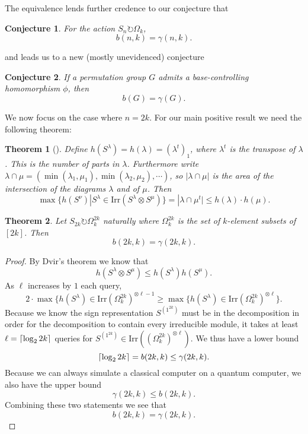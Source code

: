 \documentclass[12pt,twoside]{reedthesis}
\theoremstyle{plain}   %
\newtheorem{thm}{Theorem}[section] %
\newtheorem{conj}{Conjecture}[section]
\theoremstyle{definition}
\theoremstyle{remark}
\numberwithin{equation}{section}
\def\irr{\mathrm{Irr}}
\def\acts{\circlearrowright} %
\DeclarePairedDelimiter\ceil{\lceil}{\rceil}
\begin{document}
The equivalence lends further credence to our conjecture that
\begin{conj}
  For the action $S_n \acts \Omega_k$,
  \[ b(n,k) = \gamma(n,k).\]
\end{conj}
and leads us to a new (mostly unevidenced) conjecture
\begin{conj}
  If a permutation group $G$ admits a base-controlling homomorphism $\phi$, then
  \[ b(G) = \gamma(G).\]
\end{conj}
We now focus on the case where $n = 2k$.
For our main positive result we need the following theorem:
\begin{thm}[{\cite{dvir1993}}]
  Define $h( S^\lambda) = h(\lambda) = (\lambda^t)_1$, where $\lambda^t$ is the transpose of $\lambda$. This is the number of parts in $\lambda$.
  Furthermore write $\lambda \cap \mu = ( \min(\lambda_1,\mu_1), \min(\lambda_2,\mu_2), \cdots)$, so
  $|\lambda \cap \mu|$ is the area of the intersection of the diagrams $\lambda$ and of $\mu$. Then
  \[\max \{ h(S^\nu) | S^\lambda \in \irr (S^\lambda \otimes S^\mu) \} = | \lambda \cap \mu^t| \leq h(\lambda) \cdot h(\mu).\]
\end{thm}
\begin{thm}
  Let $S_{2k} \acts \Omega^{2k}_k$ naturally where $\Omega^{2k}_k$ is the set of $k$-element subsets of $[2k]$. Then
  \[b(2k,k) = \gamma(2k,k).\]
\end{thm}
\begin{proof}
  By Dvir's theorem we know that
  \[ h( S^\lambda \otimes S^\mu) \leq h( S^\lambda) h (S^\mu).\]
  As $\ell$ increases by $1$ each query,
  \[ 2 \cdot \max\{ h(S^\lambda) \in \irr ( \Omega^{2k}_k)^{\otimes \ell -1} \geq \max\{ h(S^\lambda) \in \irr ( \Omega^{2k}_k)^{\otimes \ell} \}.\]
  Because we know the sign representation $S^{(1^{2k})}$ must be in the decomposition in order for the decomposition to contain every irreducible module, it takes at least
  $\ell = \ceil*{ \log_2 2k }$ queries for $S^{(1^{2k})} \in \irr(( \Omega^{2k}_k)^{\otimes \ell})$.
  We thus have a lower bound
  \[\ceil*{ \log_2 2k } = b(2k,k) \leq \gamma(2k,k).\]
  Because we can always simulate a classical computer on a quantum computer, we also have the upper bound
  \[\gamma(2k,k) \leq b(2k,k).\]
  Combining these two statements we see that
  \[ b(2k,k) = \gamma(2k,k).\]
\end{proof}
\end{document}
